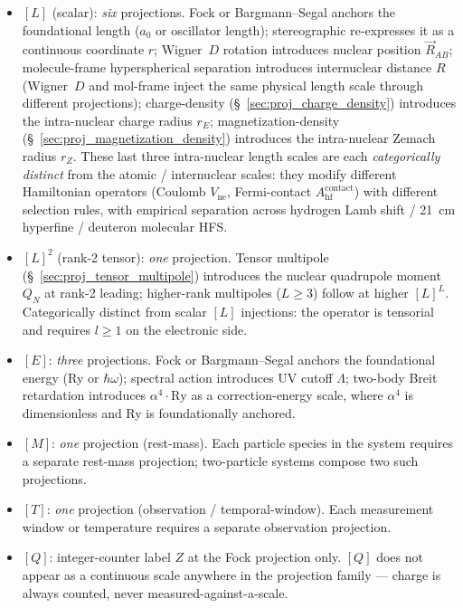 \documentclass[11pt]{article}
\begin{document}
\begin{itemize}\setlength\itemsep{0pt}
\item $[L]$ (scalar): \emph{six} projections.  Fock or
Bargmann--Segal anchors the foundational length ($a_0$ or oscillator
length); stereographic re-expresses it as a continuous coordinate
$r$; Wigner~$D$ rotation introduces nuclear position
$\vec{R}_{AB}$; molecule-frame hyperspherical separation introduces
internuclear distance $R$ (Wigner~$D$ and mol-frame inject the same
physical length scale through different projections);
charge-density (\S~\ref{sec:proj_charge_density}) introduces the
intra-nuclear charge radius $r_E$; magnetization-density
(\S~\ref{sec:proj_magnetization_density}) introduces the
intra-nuclear Zemach radius $r_Z$.  These last three intra-nuclear
length scales are each \emph{categorically distinct} from the
atomic / internuclear scales: they modify different Hamiltonian
operators (Coulomb $V_\text{ne}$, Fermi-contact
$A_\text{hf}^\text{contact}$) with different selection rules, with
empirical separation across hydrogen Lamb shift / 21~cm hyperfine /
deuteron molecular HFS.

\item $[L]^2$ (rank-2 tensor): \emph{one} projection.  Tensor
multipole (\S~\ref{sec:proj_tensor_multipole}) introduces the
nuclear quadrupole moment $Q_N$ at rank-2 leading; higher-rank
multipoles ($L \geq 3$) follow at higher $[L]^L$.  Categorically
distinct from scalar $[L]$ injections: the operator is tensorial
and requires $l \geq 1$ on the electronic side.
\item $[E]$: \emph{three} projections.  Fock or Bargmann--Segal
anchors the foundational energy (Ry or $\hbar\omega$); spectral
action introduces UV cutoff $\Lambda$; two-body Breit retardation introduces $\alpha^4 \cdot
\mathrm{Ry}$ as a correction-energy scale, where $\alpha^4$ is
dimensionless and Ry is foundationally anchored.
\item $[M]$: \emph{one} projection (rest-mass).  Each particle
species in the system requires a separate rest-mass projection;
two-particle systems compose two such projections.
\item $[T]$: \emph{one} projection (observation /
temporal-window).  Each measurement window or temperature requires
a separate observation projection.
\item $[Q]$: integer-counter label $Z$ at the Fock projection only.
$[Q]$ does not appear as a continuous scale anywhere in the
projection family --- charge is always counted, never
measured-against-a-scale.
\end{itemize}
\end{document}
